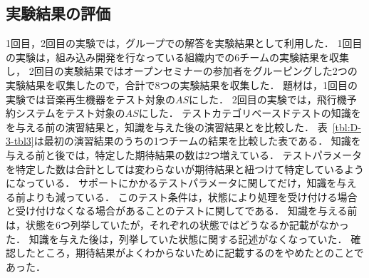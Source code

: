 \subsection{実験結果の評価}
1回目，2回目の実験では，グループでの解答を実験結果として利用した．
1回目の実験は，組み込み開発を行なっている組織内での6チームの実験結果を収集し，
2回目の実験結果ではオープンセミナーの参加者をグルーピングした2つの実験結果を収集したので，合計で8つの実験結果を収集した．
題材は，1回目の実験では音楽再生機器をテスト対象の$AS$にした．
2回目の実験では，飛行機予約システムをテスト対象の$AS$にした．
テストカテゴリベースドテストの知識をを与える前の演習結果と，知識を与えた後の演習結果とを比較した．
表~\ref{tbl:D-3-tbl3}は最初の演習結果のうちの1つチームの結果を比較した表である．
知識を与える前と後では，特定した期待結果の数は2つ増えている．
テストパラメータを特定した数は合計としては変わらないが期待結果と紐つけて特定しているようになっている．
サポートにかかるテストパラメータに関してだけ，知識を与える前よりも減っている．
このテスト条件は，状態により処理を受け付ける場合と受け付けなくなる場合があることのテストに関してである．
知識を与える前は，状態を6つ列挙していたが，それぞれの状態ではどうなるか記載がなかった．
知識を与えた後は，列挙していた状態に関する記述がなくなっていた．
確認したところ，期待結果がよくわからないために記載するのをやめたとのことであった．

